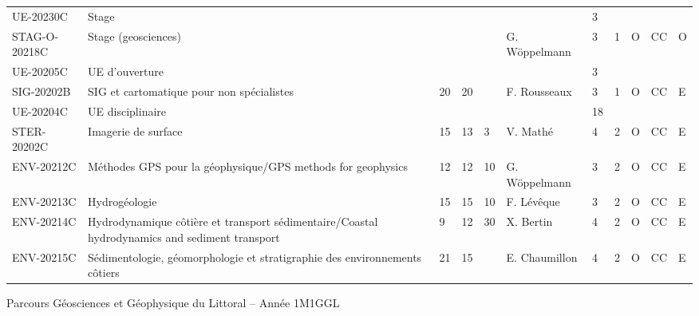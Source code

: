 \documentclass[a4paper,11pt]{article}
\begin{document}
{{\begin{tabular}{lllllllllll}
\rowcolor[HTML]{C0C0C0} 
UE-20230C     & Stage                                                                                         &    &    &    &                 & 3    &      &             &                &           \\
STAG-O-20218C & Stage (geosciences)                                                                           &    &    &    & G. Wöppelmann   & 3    & 1    & O           & CC             & O         \\
\rowcolor[HTML]{C0C0C0} 
UE-20205C     & UE d'ouverture                                                                                &    &    &    &                 & 3    &      &             &                &           \\
SIG-20202B    & SIG et cartomatique pour non spécialistes                                                     & 20 & 20 &    & F. Rousseaux    & 3    & 1    & O           & CC             & E         \\
\rowcolor[HTML]{C0C0C0} 
UE-20204C     & UE disciplinaire                                                                              &    &    &    &                 & 18   &      &             &                &           \\
STER-20202C   & Imagerie de surface                                                                           & 15 & 13 & 3  & V. Mathé        & 4    & 2    & O           & CC             & E         \\
ENV-20212C    & Méthodes GPS pour la géophysique/GPS methods for geophysics                                   & 12 & 12 & 10 & G. Wöppelmann   & 3    & 2    & O           & CC             & E         \\
ENV-20213C    & Hydrogéologie                                                                                 & 15 & 15 & 10 & F. Lévêque      & 3    & 2    & O           & CC             & E         \\
ENV-20214C    & Hydrodynamique côtière et transport sédimentaire/Coastal hydrodynamics and sediment transport & 9  & 12 & 30 & X. Bertin       & 4    & 2    & O           & CC             & E         \\
ENV-20215C    & Sédimentologie, géomorphologie et stratigraphie des environnements côtiers                    & 21 & 15 &    & E. Chaumillon   & 4    & 2    & O           & CC             & E         
\end{tabular}}
}{Parcours Géosciences et Géophysique du Littoral -- Année 1}{M1GGL}
\end{document}
